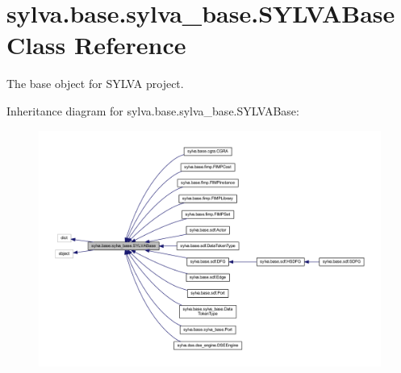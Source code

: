 \hypertarget{classsylva_1_1base_1_1sylva__base_1_1_s_y_l_v_a_base}{}\section{sylva.\+base.\+sylva\+\_\+base.\+S\+Y\+L\+V\+A\+Base Class Reference}
\label{classsylva_1_1base_1_1sylva__base_1_1_s_y_l_v_a_base}


The base object for S\+Y\+L\+VA project.  




Inheritance diagram for sylva.\+base.\+sylva\+\_\+base.\+S\+Y\+L\+V\+A\+Base\+:
\nopagebreak
\begin{figure}[H]
\begin{center}
\leavevmode
\includegraphics[width=350pt]{classsylva_1_1base_1_1sylva__base_1_1_s_y_l_v_a_base__inherit__graph}
\end{center}
\end{figure}
